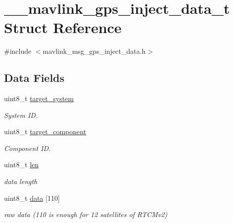 \hypertarget{struct____mavlink__gps__inject__data__t}{\section{\+\_\+\+\_\+mavlink\+\_\+gps\+\_\+inject\+\_\+data\+\_\+t Struct Reference}
\label{struct____mavlink__gps__inject__data__t}
}


{\ttfamily \#include $<$mavlink\+\_\+msg\+\_\+gps\+\_\+inject\+\_\+data.\+h$>$}

\subsection*{Data Fields}
\begin{DoxyCompactItemize}
\item 
uint8\+\_\+t \hyperlink{struct____mavlink__gps__inject__data__t_a8388c4f011ef1eb68bd7ebd0c2f1c69b}{target\+\_\+system}
\begin{DoxyCompactList}\small\item\em System I\+D. \end{DoxyCompactList}\item 
uint8\+\_\+t \hyperlink{struct____mavlink__gps__inject__data__t_aec0e9b93bbff7fd56b7cef3c18ad3e0c}{target\+\_\+component}
\begin{DoxyCompactList}\small\item\em Component I\+D. \end{DoxyCompactList}\item 
uint8\+\_\+t \hyperlink{struct____mavlink__gps__inject__data__t_aeabfb472265f0ed7adfcb7c8342f5d54}{len}
\begin{DoxyCompactList}\small\item\em data length \end{DoxyCompactList}\item 
uint8\+\_\+t \hyperlink{struct____mavlink__gps__inject__data__t_ab5db3083e64a4230a5fe35e294839917}{data} \mbox{[}110\mbox{]}
\begin{DoxyCompactList}\small\item\em raw data (110 is enough for 12 satellites of R\+T\+C\+Mv2) \end{DoxyCompactList}\end{DoxyCompactItemize}


